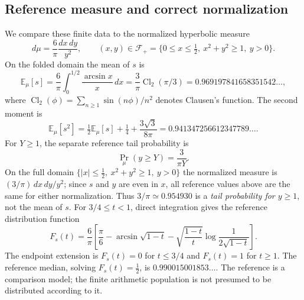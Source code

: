 \documentclass[11pt,a4paper]{article}
\newcommand{\F}{\mathcal{F}}
\newcommand{\Cl}{\operatorname{Cl}_2}
\begin{document}
\subsection{Reference measure and correct normalization}
We compare these finite data to the normalized hyperbolic measure
\begin{equation}
 d\mu=\frac{6}{\pi}\frac{dx\,dy}{y^2},\qquad (x,y)\in\F_{+}=\{0\le x\le\tfrac12,\ x^2+y^2\ge1,\ y>0\}.
\end{equation}
On the folded domain the mean of $s$ is
\begin{equation}
 \mathbb E_{\mu}[s]
 =\frac6\pi\int_0^{1/2}\frac{\arcsin x}{x}\,dx
 =\frac3\pi\Cl(\pi/3)
 =0.969197841658351542\ldots,
 \label{eq:haarmean}
\end{equation}
where $\Cl(\phi)=\sum_{n\ge1}\sin(n\phi)/n^2$ denotes Clausen's function. The second moment is
\begin{equation}
 \mathbb E_{\mu}[s^2]=\tfrac12\mathbb E_{\mu}[s]+\tfrac14+\frac{3\sqrt3}{8\pi}=0.941347256612347789\ldots.
\end{equation}
For $Y\ge1$, the separate reference tail probability is
\begin{equation}
 \Pr_{\mu}(y\ge Y)=\frac3{\pi Y}.
 \label{eq:haartail}
\end{equation}
On the full domain $\{|x|\le\frac12,\ x^2+y^2\ge1,\ y>0\}$ the normalized measure is $(3/\pi)\,dx\,dy/y^2$; since $s$ and $y$ are even in $x$, all reference values above are the same for either normalization. Thus $3/\pi\simeq0.954930$ is a \emph{tail probability for $y\ge1$}, not the mean of $s$. For $3/4\le t<1$, direct integration gives the reference distribution function
\begin{equation}
 F_s(t)=\frac6\pi\left[\frac\pi6-\arcsin\sqrt{1-t}
 -\sqrt{\frac{1-t}{t}}\log\frac{1}{2\sqrt{1-t}}\right].
 \label{eq:cdf}
\end{equation}
The endpoint extension is $F_s(t)=0$ for $t\le3/4$ and $F_s(t)=1$ for $t\ge1$. The reference median, solving $F_s(t)=\frac12$, is $0.990015001853\ldots$. The reference is a comparison model; the finite arithmetic population is not presumed to be distributed according to it.
\end{document}

